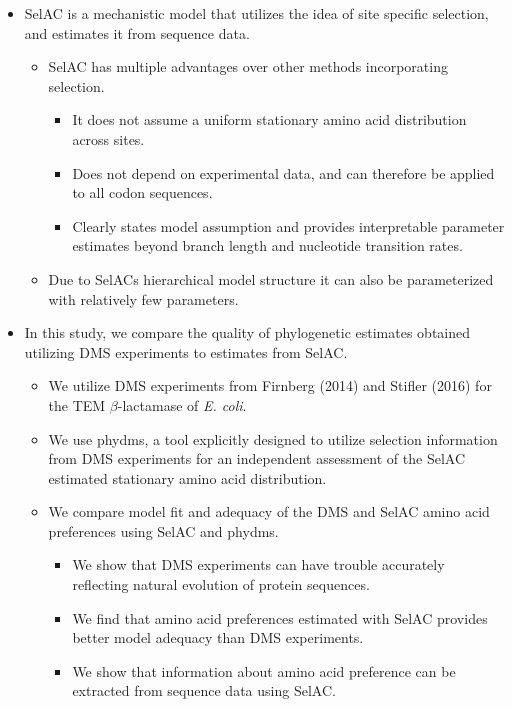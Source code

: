 \documentclass[12pt]{article}
\begin{document}
\begin{itemize}
	\item SelAC is a mechanistic model that utilizes the idea of site specific selection, and estimates it from sequence data.
	\begin{itemize}
		\item SelAC has multiple advantages over other methods incorporating selection.
		\begin{itemize}
			\item It does not assume a uniform stationary amino acid distribution across sites.
			\item Does not depend on experimental data, and can therefore be applied to all codon sequences.
			\item Clearly states model assumption and provides interpretable parameter estimates beyond branch length and nucleotide transition rates.
		\end{itemize}
		\item Due to SelACs hierarchical model structure it can also be parameterized with relatively few parameters.
	\end{itemize}
	\item In this study, we compare the quality of phylogenetic estimates obtained utilizing DMS experiments to estimates from SelAC.
	\begin{itemize}
		\item We utilize DMS experiments from Firnberg (2014) and Stifler (2016) for the TEM $\beta$-lactamase of \textit{E. coli}.
		\item We use phydms, a tool explicitly designed to utilize selection information from DMS experiments for an independent assessment of the SelAC estimated stationary amino acid distribution. 
		\item We compare model fit and adequacy of the DMS and SelAC amino acid preferences using SelAC and phydms.
		\begin{itemize}
			\item We show that DMS experiments can have trouble accurately reflecting natural evolution of protein sequences.	
			\item We find that amino acid preferences estimated with SelAC provides better model adequacy than DMS experiments.
			\item We show that information about amino acid preference can be extracted from sequence data using SelAC.
		\end{itemize}	
	\end{itemize}
\end{itemize}
\end{document}
